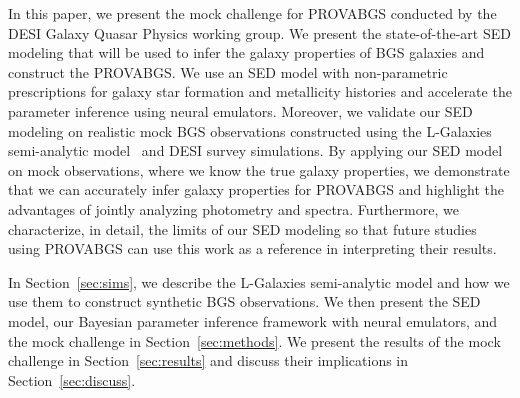 
In this paper, we present the mock challenge for PROVABGS conducted by the DESI
Galaxy Quasar Physics working group. 
We present the state-of-the-art SED modeling that will be used to infer the
galaxy properties of BGS galaxies and construct the PROVABGS. 
We use an SED model with non-parametric prescriptions for galaxy star formation
and metallicity histories and accelerate the parameter inference using neural
emulators. 
Moreover, we validate our SED modeling on realistic mock BGS observations
constructed using the {\sc L-Galaxies} semi-analytic
model~\citep{henriques2015} and DESI survey simulations. 
By applying our SED model on mock observations, where we know the true galaxy
properties, we demonstrate that we can accurately infer galaxy properties for
PROVABGS and highlight the advantages of jointly analyzing photometry and
spectra. 
Furthermore, we characterize, in detail, the limits of our SED modeling so
that future studies using PROVABGS can use this work as a reference in
interpreting their results. 

In Section~\ref{sec:sims}, we describe the {\sc L-Galaxies} semi-analytic model
and how we use them to construct synthetic BGS observations. 
We then present the SED model, our Bayesian parameter inference framework with
neural emulators, and the mock challenge in Section~\ref{sec:methods}. 
We present the results of the mock challenge in Section~\ref{sec:results} and
discuss their implications in Section~\ref{sec:discuss}. 
